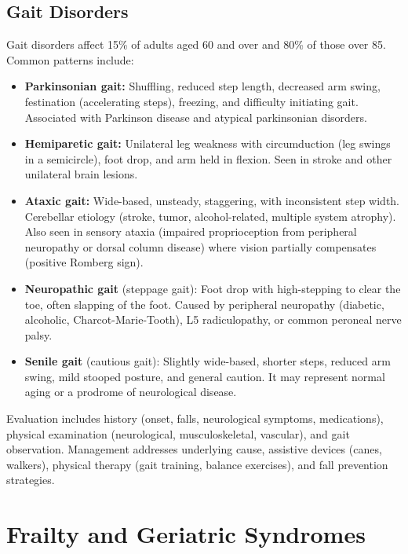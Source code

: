 \subsection{Gait Disorders}
\label{sec:Gait Disorders}

Gait disorders affect 15\% of adults aged 60 and over and 80\% of those over 85. Common patterns include:
\begin{itemize}[noitemsep]
  \item \textbf{Parkinsonian gait:} Shuffling, reduced step length, decreased arm swing, festination (accelerating steps), freezing, and difficulty initiating gait. Associated with Parkinson disease and atypical parkinsonian disorders.
  \item \textbf{Hemiparetic gait:} Unilateral leg weakness with circumduction (leg swings in a semicircle), foot drop, and arm held in flexion. Seen in stroke and other unilateral brain lesions.
  \item \textbf{Ataxic gait:} Wide-based, unsteady, staggering, with inconsistent step width. Cerebellar etiology (stroke, tumor, alcohol-related, multiple system atrophy). Also seen in sensory ataxia (impaired proprioception from peripheral neuropathy or dorsal column disease) where vision partially compensates (positive Romberg sign).
  \item \textbf{Neuropathic gait} (steppage gait): Foot drop with high-stepping to clear the toe, often slapping of the foot. Caused by peripheral neuropathy (diabetic, alcoholic, Charcot-Marie-Tooth), L5 radiculopathy, or common peroneal nerve palsy.
  \item \textbf{Senile gait} (cautious gait): Slightly wide-based, shorter steps, reduced arm swing, mild stooped posture, and general caution. It may represent normal aging or a prodrome of neurological disease.
\end{itemize}
Evaluation includes history (onset, falls, neurological symptoms, medications), physical examination (neurological, musculoskeletal, vascular), and gait observation. Management addresses underlying cause, assistive devices (canes, walkers), physical therapy (gait training, balance exercises), and fall prevention strategies.

\section{Frailty and Geriatric Syndromes}

